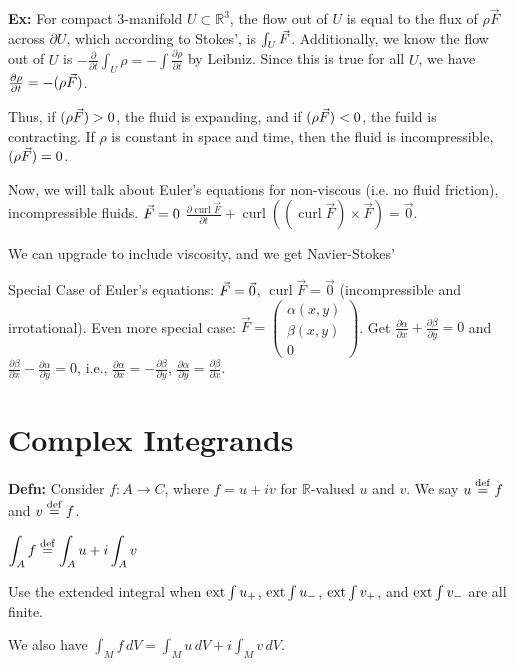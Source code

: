 \documentclass[10pt,letterpaper]{article}
\newcommand{\n}{\hfill\break}
\newcommand{\defn}[1]{\par\noindent\settowidth{\hangindent}{\textbf{Defn: }}\textbf{Defn: }#1\n}
\newcommand{\ex}[1]{\par\noindent\settowidth{\hangindent}{\textbf{Ex: }}\textbf{Ex: }#1\n}
\newcommand{\ptxt}[1]{\textrm{\textnormal{#1}}}
\newcommand{\inlineeq}[1]{\centerline{$\displaystyle #1$}}
\newcommand{\reals}{\mathbb{R}}
\newcommand{\R}{\reals}
\newcommand{\extint}{\ptxt{ext}\int}
\newcommand{\pd}[2]{\frac{\partial{}#1}{\partial{}#2}}
\DeclareMathOperator{\curl}{curl}
\let\div\relax
\DeclareMathOperator{\div}{div}
\let\Re\relax
\DeclareMathOperator{\Re}{Re}
\let\Im\relax
\DeclareMathOperator{\Im}{Im}
\newcommand{\eqdef}{\overset{\ptxt{def}}{=}}
\newcommand{\paren}[1]{\left(#1\right)}
\begin{document}
\ex{For compact $3$-manifold $U\subset\R^{3}$, the flow out of $U$ is equal to the flux of $\rho\vec{F}$ across $\partial{}U$, which according to Stokes', is $\int_{U}\div\vec{F}$.\n
Additionally, we know the flow out of $U$ is $-\pd{}{t}\int_{U}\rho=-\int\pd{\rho}{t}$ by Leibniz. Since this is true for all $U$, we have $\pd{\rho}{t}=-\div(\rho\vec{F})$.}

\par\noindent Thus, if $\div(\rho\vec{F})>0$, the fluid is expanding, and if $\div(\rho\vec{F})<0$, the fuild is contracting. If $\rho$ is constant in space and time, then the fluid is incompressible, $\div(\rho\vec{F})=0$.\n

\par\noindent Now, we will talk about Euler's equations for non-viscous (i.e. no fluid friction), incompressible fluids.\n
$\div\vec{F}=0$\n
$\pd{\curl\vec{F}}{t}+\curl((\curl\vec{F})\times\vec{F})=\vec{0}$.\n

\par\noindent We can upgrade to include viscosity, and we get Navier-Stokes'\n

\par\noindent Special Case of Euler's equations: $\div\vec{F}=\vec{0}$, $\curl\vec{F}=\vec{0}$ (incompressible and irrotational).\n
Even more special case: $\vec{F}=\paren{\begin{array}{c}\alpha(x,y)\\ \beta(x,y)\\ 0\end{array}}$. Get $\pd{\alpha}{x}+\pd{\beta}{y}=0$ and $\pd{\beta}{x}-\pd{\alpha}{y}=0$, i.e., $\pd{\alpha}{x}=-\pd{\beta}{y}$, $\pd{\alpha}{y}=\pd{\beta}{x}$.\n

\section*{Complex Integrands}

\defn{Consider $f:A\to{}C$, where $f=u+iv$ for $\R$-valued $u$ and $v$. We say $u\eqdef\Re{}f$ and $v\eqdef\Im{}f$.\n
\inlineeq{
	\int_{A}f\eqdef\int_{A}u+i\int_{A}v
}}

\par\noindent Use the extended integral when $\extint{}u_{+}$, $\extint{}u_{-}$, $\extint{}v_{+}$, and $\extint{}v_{-}$ are all finite.\n

\par\noindent We also have $\displaystyle\int_{M}f\,dV=\int_{M}u\,dV+i\int_{M}v\,dV$.\n
\end{document}
